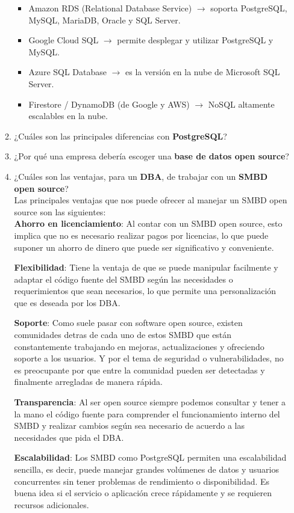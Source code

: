 \documentclass[12pt]{report}
\begin{document}
\begin{enumerate}[label=\roman*.]
\begin{enumerate}[label=\textbf{\arabic*.}, itemsep=2.0em]
\begin{itemize}
    \item Amazon RDS (Relational Database Service) $\rightarrow$ soporta PostgreSQL, MySQL, MariaDB, Oracle y SQL Server.
    \item Google Cloud SQL $\rightarrow$ permite desplegar y utilizar PostgreSQL y MySQL.
    \item Azure SQL Database $\rightarrow$ es la versión en la nube de Microsoft SQL Server.
    \item Firestore / DynamoDB (de Google y AWS) $\rightarrow$ NoSQL altamente escalables en la nube.
\end{itemize}
  \item ¿Cuáles son las principales diferencias con \textbf{PostgreSQL}?

  \item ¿Por qué una empresa debería escoger una \textbf{base de datos open source}?

  \item ¿Cuáles son las ventajas, para un \textbf{DBA}, de trabajar con un \textbf{SMBD open source}?\\
Las principales ventajas que nos puede ofrecer al manejar un SMBD open source son las siguientes:\\
\textbf{Ahorro en licenciamiento}: Al contar con un SMBD open source, esto implica que no es necesario realizar pagos por licencias, lo que puede suponer un ahorro de dinero que puede ser significativo y conveniente.

\textbf{Flexibilidad}: Tiene la ventaja de que se puede manipular facilmente y adaptar el código fuente del SMBD según las necesidades o requerimientos que sean necesarios, lo que permite una personalización que es deseada por los DBA.

\textbf{Soporte}: Como suele pasar con software open source, existen comunidades detras de cada uno de estos SMBD que están constantemente trabajando en mejoras, actualizaciones y ofreciendo soporte a los usuarios. Y por el tema de seguridad o vulnerabilidades, no es preocupante por que entre la comunidad pueden ser detectadas y finalmente arregladas de manera rápida.

\textbf{Transparencia}: Al ser open source siempre podemos consultar y tener a la mano el código fuente para comprender el funcionamiento interno del SMBD y realizar cambios según sea necesario de acuerdo a las necesidades que pida el DBA.

\textbf{Escalabilidad}: Los SMBD como PostgreSQL permiten una escalabilidad sencilla, es decir, puede manejar grandes volúmenes de datos y usuarios concurrentes sin tener problemas de rendimiento o disponibilidad. Es buena idea si el servicio o aplicación crece rápidamente y se requieren recursos adicionales.


\end{enumerate}
\end{enumerate}
\end{document}
